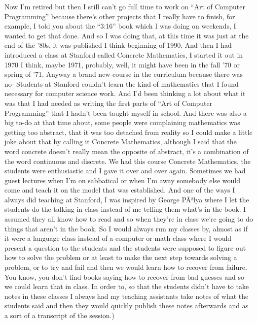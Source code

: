 \documentclass[]{article}
\begin{document}
Now I'm retired but then I still can't go full time to work on ``Art of
Computer Programming'' because there's other projects that I really have
to finish, for example, I told you about the ``3:16'' book which I was
doing on weekends, I wanted to get that done. And so I was doing that,
at this time it was just at the end of the '80s, it was published I
think beginning of 1990. And then I had introduced a class at Stanford
called Concrete Mathematics, I started it out in 1970 I think, maybe
1971, probably, well, it might have been in the fall '70 or spring of
'71. Anyway a brand new course in the curriculum because there was no-
Students at Stanford couldn't learn the kind of mathematics that I found
necessary for computer science work. And I'd been thinking a lot about
what it was that I had needed as writing the first parts of ``Art of
Computer Programming'' that I hadn't been taught myself in school. And
there was also a big to-do at that time about, some people were
complaining mathematics was getting too abstract, that it was too
detached from reality so I could make a little joke about that by
calling it Concrete Mathematics, although I said that the word concrete
doesn't really mean the opposite of abstract, it's a combination of the
word continuous and discrete. We had this course Concrete Mathematics,
the students were enthusiastic and I gave it over and over again.
Sometimes we had guest lectures when I'm on sabbatical or when I'm away
somebody else would come and teach it on the model that was established.
And one of the ways I always did teaching at Stanford, I was inspired by
George PÃ³lya where I let the students do the talking in class instead
of me telling them what's in the book. I assumed they all know how to
read and so when they're in class we're going to do things that aren't
in the book. So I would always run my classes by, almost as if it were a
language class instead of a computer or math class where I would present
a question to the students and the students were supposed to figure out
how to solve the problem or at least to make the next step towards
solving a problem, or to try and fail and then we would learn how to
recover from failure. You know, you don't find books saying how to
recover from bad guesses and so we could learn that in class. In order
to, so that the students didn't have to take notes in these classes I
always had my teaching assistants take notes of what the students said
and then they would quickly publish these notes afterwards and as a sort
of a transcript of the session.)
\end{document}
